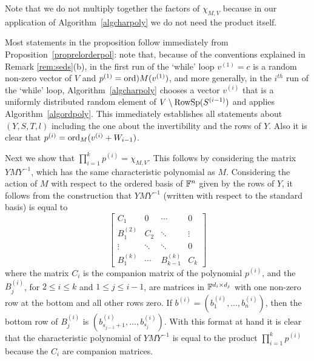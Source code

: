 \begin{Rem}
Note that we do not multiply together the factors of 
$\chi_{M,V}$ because in our application of Algorithm~\ref{algcharpoly} 
we do not need the product itself.
\end{Rem}

Most statements in the proposition follow immediately from 
Proposition~\ref{proprelorderpol}: note that, because of the conventions
explained in Remark \ref{rem:seds}(b), in the first run of the
`while' loop $v^{(1)}=c$ is a random non-zero vector of $V$ and
$p^{(1)}=\mathrm{ord})M(v^{(1)})$, and more generally,
in the $i^{th}$ run of the 
`while' loop, Algorithm~\ref{algcharpoly}
chooses a  vector $v^{(i)}$ that is a uniformly distributed random element 
of $V\setminus \mathrm{RowSp}(S^{(i-1)})$
and applies Algorithm~\ref{algordpoly}.
This immediately establishes all statements about
$(Y,S,T,l)$ including the one about the invertibility and the
rows of $Y$. Also it is clear that $p^{(i)} = \mathrm{ord}_M(v^{(i)} + W_{i-1})$.

Next we show that $\prod_{i=1}^k p^{(i)} = \chi_{M,V}$. 
This follows by considering
the matrix $YMY^{-1}$, which has the same characteristic polynomial
as $M$. Considering the action of $M$ with respect to the 
ordered basis of $\mathbb{F}^n$ given by the rows of $Y$, it follows from
the construction that $YMY^{-1}$ 
(written with respect to the standard basis) is equal to
\[ \left[\begin{array}{cccc}
 C_1       &   0  & \cdots & 0 \\
 B^{(2)}_1 &  C_2 & \ddots & \vdots \\
 \vdots    &\ddots& \ddots & 0 \\
 B^{(k)}_1 &\cdots& B^{(k)}_{k-1} & C_k
\end{array} \right] \]
where the matrix $C_i$ is the companion matrix of the polynomial $p^{(i)}$,
and the $B^{(i)}_j$, for $2 \le i \le k$ and $1 \le j \le i-1$, are matrices
in $\mathbb{F}^{d_i \times d_j}$
with one non-zero row at the bottom and all other rows zero.
If $b^{(i)} = (b^{(i)}_1,\dots,b^{(i)}_n)$, then the bottom row of 
$B^{(i)}_j$ is $(b^{(i)}_{s_{j-1}+1},\dots,b^{(i)}_{s_j})$.
With this format at hand it is clear that the characteristic polynomial
of $YMY^{-1}$ is equal to the product $\prod_{i=1}^k p^{(i)}$ because
the $C_i$ are companion matrices.

